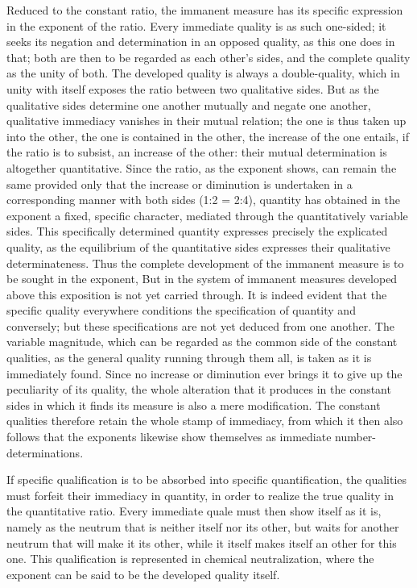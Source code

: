 \documentclass[12pt,a4paper,openany]{book}
\newcommand{\opage}[1]{\marginnote{\footnotesize\textit{[#1]}}}
\begin{document}
Reduced to the constant ratio, the immanent measure has its specific expression in the exponent of the ratio. Every immediate quality is as such one-sided; it seeks its negation and determination in an opposed quality, as this one does in that; both are then to be regarded as each other's sides, and the complete quality as the unity of both. The developed quality is always a double-quality, which in unity with itself exposes the ratio between two qualitative sides. But as the qualitative sides determine one another mutually and negate one another, qualitative immediacy vanishes in their mutual relation; the one is thus taken up into the other, the one is contained in the other, the increase of the one entails, if the ratio is to subsist, an increase of the other: their mutual determination is altogether quantitative. Since the ratio, as the exponent shows, can remain the same provided only that the increase or diminution is undertaken in a corresponding manner with both sides (1:2 = 2:4), quantity has obtained in the exponent a fixed, specific character, mediated through the quantitatively variable sides. This specifically determined quantity expresses precisely the explicated quality, as the equilibrium of the quantitative sides expresses their qualitative determinateness. Thus the complete development of the immanent measure is to be sought in the exponent,
\setcounter{footnote}{0}%
\opage{67}But in the system of immanent measures developed above this exposition is not yet carried through. It is indeed evident that the specific quality everywhere conditions the specification of quantity and conversely; but these specifications are not yet deduced from one another. The variable magnitude, which can be regarded as the common side of the constant qualities, as the general quality running through them all, is taken as it is immediately found. Since no increase or diminution ever brings it to give up the peculiarity of its quality, the whole alteration that it produces in the constant sides in which it finds its measure is also a mere modification. The constant qualities therefore retain the whole stamp of immediacy, from which it then also follows that the exponents likewise show themselves as immediate number-determinations.

If specific qualification is to be absorbed into specific quantification, the qualities must forfeit their immediacy in quantity, in order to realize the true quality in the quantitative ratio. Every immediate quale must then show itself as it is, namely as the neutrum that is neither itself nor its other, but waits for another neutrum that will make it its other, while it itself makes itself an other for this one. This qualification is represented in chemical neutralization, where the exponent can be said to be the developed quality itself.
\end{document}
